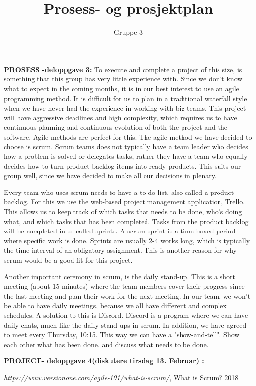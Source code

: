 \documentclass{article}
\begin{document}
\title{Prosess- og prosjektplan}
\author{Gruppe 3}

\maketitle


\raggedright

\textbf{PROSESS -deloppgave 3:} To execute and complete a project of this size, is something that this group has very little experience with. Since we don't know what to expect in the coming months, it is in our best interest to use an agile programming method. It is difficult for us to plan in a traditional waterfall style when we have never had the experience in working with big teams. This project will have aggressive deadlines and high complexity, which requires us to have continuous planning and continuous evolution of both the project and the software. Agile methods are perfect for this. \newline
\newline
The agile method we have decided to choose is scrum. Scrum teams does not typically have a team leader who decides how a problem is solved or delegates tasks, rather they have a team who equally decides how to turn product backlog items into ready products. This suits our group well, since we have decided to make all our decisions in plenary. \newline

Every team who uses scrum needs to have a to-do list, also called a product backlog. For this we use the web-based project management application, Trello. This allows us to keep track of which tasks that needs to be done, who's doing what, and which tasks that has been completed. Tasks from the product backlog will be completed in so called sprints. A scrum sprint is a time-boxed period where specific work is done. Sprints are usually 2-4 works long, which is typically the time interval of an obligatory assignment. This is another reason for why scrum would be a good fit for this project. \newline

Another important ceremony in scrum, is the daily stand-up. This is a short meeting (about 15 minutes) where the team members cover their progress since the last meeting and plan their work for the next meeting. In our team, we won't be able to have daily meetings, because we all have different and complex schedules. A solution to this is Discord. Discord is a program where we can have daily chats, much like the daily stand-ups in scrum. In addition, we have agreed to meet every Thursday, 10:15. This way we can have a "show-and-tell". Show each other what has been done, and discuss what needs to be done.
\newline

\textbf{PROJECT- deloppgave 4(diskutere tirsdag 13. Februar) :}


\begin{thebibliography}{9}

 
  \textit{https://www.versionone.com/agile-101/what-is-scrum/},
  What is Scrum?
  2018

\end{thebibliography}
\end{document}
